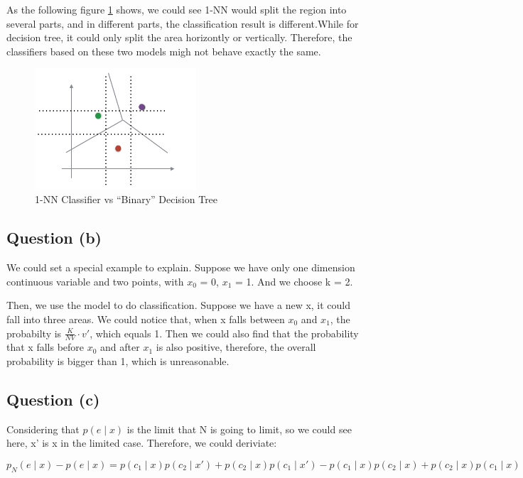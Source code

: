\documentclass{article} %
\begin{document}
As the following figure \ref{fig:knn} shows, we could see 1-NN would split the
region into several parts, and in different parts, the classification result is
different.While for decision tree, it could only split the area horizontly or
vertically. Therefore, the classifiers based on these two models migh not behave
exactly the same. 

\begin{figure}[!htbp]
\begin{center}
\includegraphics[width=60mm]{pic/knn.png}
\end{center}
\label{fig:knn}
\caption{1-NN Classifier vs ``Binary'' Decision Tree}
\end{figure}


\subsection{Question (b)}
We could set a special example to explain. Suppose we have only one dimension
continuous variable and two points, with $x_0$ = 0, $x_1$ = 1. And we choose k = 2.

Then, we use the model to do classification. Suppose we have a new x, it could
fall into three areas. We could notice that, when x falls between $x_0$ and
$x_1$, the probabilty is $\frac{K}{NV} \cdot v'$, which equals 1. Then we could
also find that the probability that x falls before $x_0$ and after $x_1$ is also
positive, therefore, the overall probability is bigger than 1, which is
unreasonable.


\subsection{Question (c)}
Considering that $p(e \mid x)$ is the limit that N is going to limit, so we
could see here, x' is x in the limited case. Therefore, we could deriviate:

\begin{equation}
p_N(e \mid x) - p(e \mid x) =
p(c_1 \mid x) p(c_2 \mid x') + p(c_2 \mid x) p(c_1 \mid x')
- p(c_1 \mid x) p(c_2 \mid x ) + p(c_2 \mid x) p(c_1 \mid x)
\end{equation}
\end{document}
